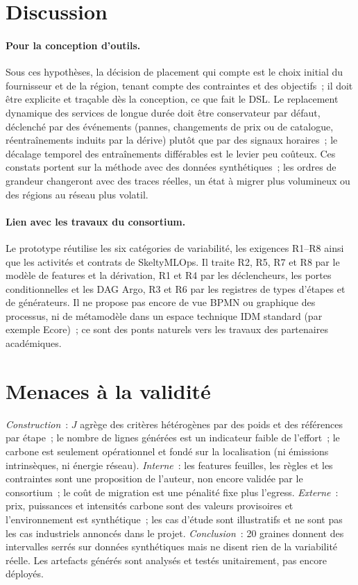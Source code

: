 \documentclass[10pt,a4paper]{article}
\begin{document}
\section{Discussion}
\paragraph{Pour la conception d'outils.} Sous ces hypothèses, la décision de placement
qui compte est le choix initial du fournisseur et de la région, tenant compte des
contraintes et des objectifs~; il doit être explicite et traçable dès la conception,
ce que fait le DSL. Le replacement dynamique des services de longue durée doit être
conservateur par défaut, déclenché par des événements (pannes, changements de prix ou
de catalogue, réentraînements induits par la dérive) plutôt que par des signaux
horaires~; le décalage temporel des entraînements différables est le levier peu
coûteux. Ces constats portent sur la méthode avec des données synthétiques~; les
ordres de grandeur changeront avec des traces réelles, un état à migrer plus
volumineux ou des régions au réseau plus volatil.

\paragraph{Lien avec les travaux du consortium.} Le prototype réutilise les six
catégories de variabilité, les exigences R1--R8 ainsi que les activités et contrats de
SkeltyMLOps. Il traite R2, R5, R7 et R8 par le modèle de features et la dérivation,
R1 et R4 par les déclencheurs, les portes conditionnelles et les DAG Argo, R3 et R6
par les registres de types d'étapes et de générateurs. Il ne propose pas encore de vue
BPMN ou graphique des processus, ni de métamodèle dans un espace technique IDM standard
(par exemple Ecore)~; ce sont des ponts naturels vers les travaux des partenaires
académiques.

\section{Menaces à la validité}
\emph{Construction}~: \(J\) agrège des critères hétérogènes par des poids et des
références par étape~; le nombre de lignes générées est un indicateur faible de
l'effort~; le carbone est seulement opérationnel et fondé sur la localisation (ni
émissions intrinsèques, ni énergie réseau). \emph{Interne}~: les features feuilles, les
règles et les contraintes sont une proposition de l'auteur, non encore validée par le
consortium~; le coût de migration est une pénalité fixe plus l'egress.
\emph{Externe}~: prix, puissances et intensités carbone sont des valeurs
provisoires et l'environnement est synthétique~; les cas d'étude sont illustratifs et
ne sont pas les cas industriels annoncés dans le projet. \emph{Conclusion}~: 20 graines
donnent des intervalles serrés sur données synthétiques mais ne disent rien de la
variabilité réelle. Les artefacts générés sont analysés et testés unitairement, pas
encore déployés.
\end{document}
